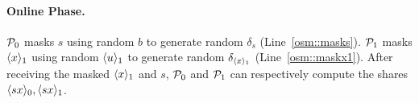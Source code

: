 \paragraph{Online Phase.}
$\mathcal{P}_0$ masks $s$ using random $b$ to generate random $\delta_s$ (Line~\ref{osm::masks}).
$\mathcal{P}_1$ masks $\langle x\rangle_1$ using random $\langle u\rangle_1$ to generate random $\delta_{\langle x\rangle_1}$ (Line~\ref{osm::maskx1}).
After receiving the masked $\langle x\rangle_1$ and $s$, $\mathcal{P}_0$ and $\mathcal{P}_1$ can respectively compute the shares $\langle sx\rangle_0, \langle sx\rangle_1$.








%





